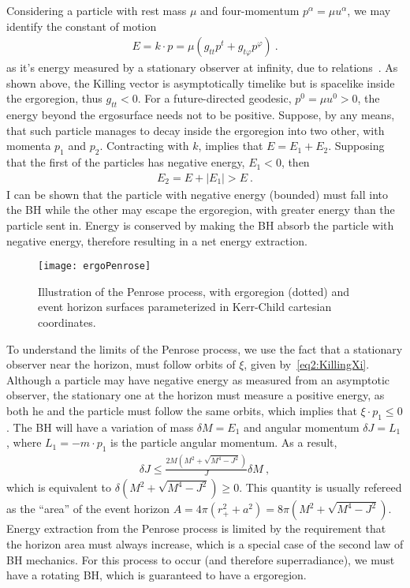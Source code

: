 Considering a particle with rest mass $\mu$ and four-momentum $p^\alpha = \mu u^\alpha$, we may identify the constant of motion 
\begin{align}
    E = k \cdot p = \mu ( g_{tt} p^t + g_{t\varphi} p^\varphi ) ~.
    \label{eq2:PenroseE0}
\end{align}
as it's energy measured by a stationary observer at infinity, due to relations~. As shown above, the Killing vector is asymptotically timelike but is spacelike inside the ergoregion, thus $g_{tt}<0$. For a future-directed geodesic, $p^0 = \mu u^0 > 0$, the energy beyond the ergosurface needs not to be positive. Suppose, by any means, that such particle manages to decay inside the ergoregion into two other, with momenta $p_1$ and $p_2$. Contracting with $k$, implies that $E = E_1+E_2$. Supposing that the first of the particles has negative energy, $E_1<0$, then 
\begin{align}
    E_2 = E + |E_1| > E ~.
    \label{eq2:PenroseE2}
\end{align}
I can be shown that the particle with negative energy (bounded) must fall into the BH while the other may escape the ergoregion, with greater energy than the particle sent in. Energy is conserved by making the BH absorb the particle with negative energy, therefore resulting in a net energy extraction.

\begin{figure}[h]
    \centering
    \vspace{0.2cm}
    \texttt{[image: ergoPenrose]}
    \caption{Illustration of the Penrose process, with ergoregion (dotted) and event horizon surfaces parameterized in Kerr-Child cartesian coordinates.}
    \label{fig2:penroseProcess}
\end{figure}

To understand the limits of the Penrose process, we use the fact that a stationary observer near the horizon, must follow orbits of $\xi$, given by~\eqref{eq2:KillingXi}. 
Although a particle may have negative energy as measured from an asymptotic observer, the stationary one at the horizon must measure a positive energy, as both he and the particle must follow the same orbits, which implies that $\xi \cdot  p_1 \le 0$. The BH will have a variation of mass $\delta M =E_1$ and angular momentum $\delta J = L_1$, where $L_1 = -m \cdot p_1$ is the particle angular momentum. As a result,
\begin{align}
    \delta J \le \frac{2M\left(M^2+\sqrt{M^4-J^2}\right)}{J} \delta M ~,
\end{align}
which is equivalent to $\delta \left(M^2+\sqrt{M^4-J^2}\right) \ge 0$. This quantity is usually refereed as the ``area'' of the event horizon $A=4\pi(r_+^2+a^2)=8\pi\left(M^2+\sqrt{M^4-J^2}\right)$. Energy extraction from the Penrose process is limited by the requirement that the horizon area must always increase, which is a special case of the second law of BH mechanics. For this process to occur (and therefore superradiance), we must have a rotating BH, which is guaranteed to have a ergoregion.


\cleardoublepage